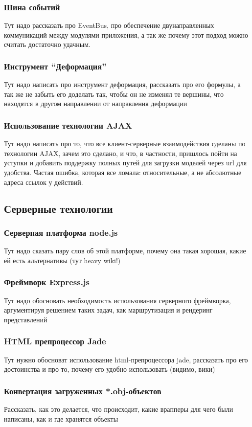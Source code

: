 \documentclass[12pt, a4paper]{article}
\begin{document}
\subsubsection{Шина событий}
Тут надо рассказать про EventBus, про обеспечение двунаправленных
коммуникаций между модулями приложения, а так же почему этот подход
можно считать достаточно удачным.
\subsubsection{Инструмент ``Деформация''}
Тут надо написать про инструмент деформация, рассказать про его формулы,
а так же не забыть его доделать так, чтобы он не изменял те вершины, что
находятся в другом направлении от направления деформации
\subsubsection{Использование технологии AJAX}
Тут надо написать про то, что все клиент-серверные взаимодействия сделаны по
технологии AJAX, зачем это сделано, и что, в частности, пришлось пойти на
уступки и добавить поддержку полных путей для загрузки моделей через url для
удобства. Частая ошибка, которая все ломала: относительные, а не абсолютные
адреса ссылок у действий.

\subsection{Серверные технологии}
\subsubsection{Серверная платформа node.js}
Тут надо сказать пару слов об этой платформе, почему она такая хорошая,
какие ей есть альтернативы (тут heavy wiki!)
\subsubsection{Фреймворк Express.js}
Тут надо обосновать необходимость использования серверного фреймворка,
аргументируя решением таких задач, как маршрутизация и рендеринг представлений
\subsubsection{HTML препроцессор Jade}
Тут нужно обосноват использование html-препроцессора jade, рассказать про его
достоинства и про то, почему его удобно использовать (видимо, вики)
\subsubsection{Конвертация загруженных *.obj-объектов}
Рассказать, как это делается, что происходит, какие врапперы для чего были
написаны, как и где хранятся объекты
\end{document}
